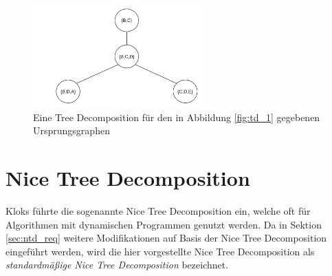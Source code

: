 \begin{figure}
\centering
\includegraphics[width=0.6\textwidth]{./imgs/TD_2.png}
\caption{Eine Tree Decomposition für den in Abbildung \ref{fig:td_1} gegebenen Ursprungsgraphen}
\label{fig:td_2}
\end{figure}

\section{Nice Tree Decomposition}
\label{sec:ntd_ntd}
Kloks \cite{kloks1994} führte die sogenannte Nice Tree Decomposition ein, welche oft für Algorithmen mit dynamischen Programmen genutzt werden. Da in Sektion \ref{sec:ntd_req} weitere Modifikationen auf Basis der Nice Tree Decomposition eingeführt werden, wird die hier vorgestellte Nice Tree Decomposition als \textit{standardmäßige Nice Tree Decomposition} bezeichnet.


